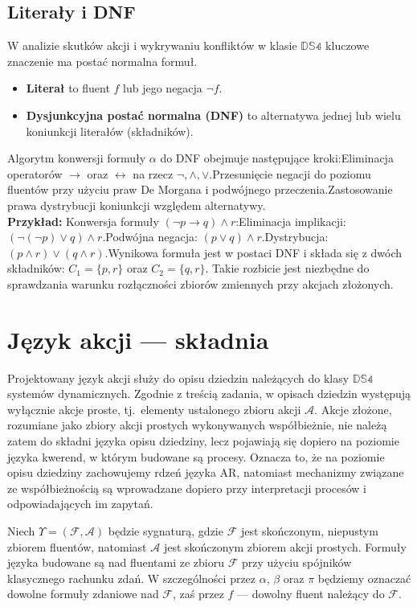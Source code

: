 \documentclass[11pt,a4paper]{article}
\theoremstyle{definition}
\begin{document}
\subsection{Literały i DNF}

W analizie skutków akcji i wykrywaniu konfliktów w klasie $\mathbb{DS4}$ kluczowe znaczenie ma postać normalna formuł.\begin{itemize}\item \textbf{Literał} to fluent $f$ lub jego negacja $\neg f$.\item \textbf{Dysjunkcyjna postać normalna (DNF)} to alternatywa jednej lub wielu koniunkcji literałów (składników).\end{itemize}Algorytm konwersji formuły $\alpha$ do DNF obejmuje następujące kroki:Eliminacja operatorów $\to$ oraz $\leftrightarrow$ na rzecz $\neg, \land, \lor$.Przesunięcie negacji do poziomu fluentów przy użyciu praw De Morgana i podwójnego przeczenia.Zastosowanie prawa dystrybucji koniunkcji względem alternatywy.\\
\textbf{Przykład:} Konwersja formuły $(\neg p \to q) \land r$:Eliminacja implikacji: $(\neg(\neg p) \lor q) \land r$.Podwójna negacja: $(p \lor q) \land r$.Dystrybucja: $(p \land r) \lor (q \land r)$.Wynikowa formuła jest w postaci DNF i składa się z dwóch składników: $C_1 = \{p, r\}$ oraz $C_2 = \{q, r\}$. Takie rozbicie jest niezbędne do sprawdzania warunku rozłączności zbiorów zmiennych przy akcjach złożonych.

\section{Język akcji --- składnia}

Projektowany język akcji służy do opisu dziedzin należących do klasy $\mathbb{DS4}$ systemów dynamicznych. Zgodnie z treścią zadania, w opisach dziedzin występują wyłącznie akcje proste, tj.\ elementy ustalonego zbioru akcji $\mathcal{A}$. Akcje złożone, rozumiane jako zbiory akcji prostych wykonywanych współbieżnie, nie należą zatem do składni języka opisu dziedziny, lecz pojawiają się dopiero na poziomie języka kwerend, w którym budowane są procesy. Oznacza to, że na poziomie opisu dziedziny zachowujemy rdzeń języka AR, natomiast mechanizmy związane ze współbieżnością są wprowadzane dopiero przy interpretacji procesów i odpowiadających im zapytań.

Niech $\Upsilon=(\mathcal{F},\mathcal{A})$ będzie sygnaturą, gdzie $\mathcal{F}$ jest skończonym, niepustym zbiorem fluentów, natomiast $\mathcal{A}$ jest skończonym zbiorem akcji prostych. Formuły języka budowane są nad fluentami ze zbioru $\mathcal{F}$ przy użyciu spójników klasycznego rachunku zdań. W szczególności przez $\alpha$, $\beta$ oraz $\pi$ będziemy oznaczać dowolne formuły zdaniowe nad $\mathcal{F}$, zaś przez $f$ --- dowolny fluent należący do $\mathcal{F}$.
\end{document}
